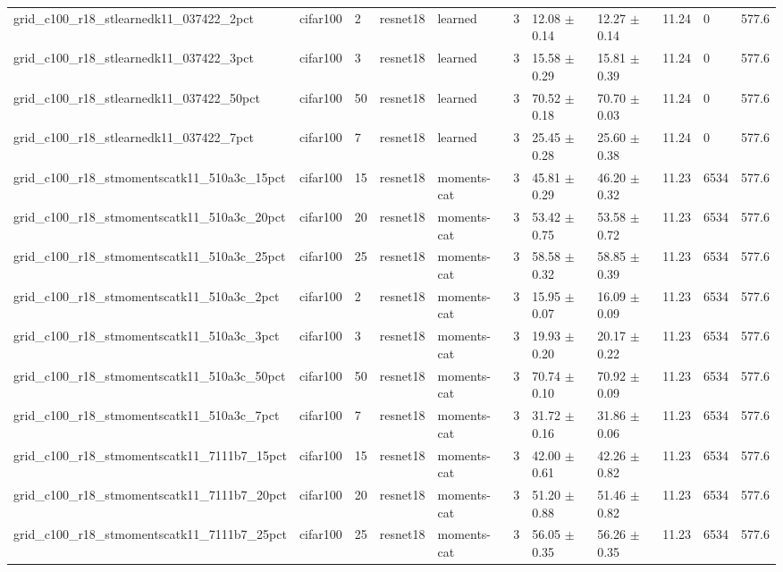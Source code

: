 \begin{tabular}{lllllllllll}
grid_c100_r18_stlearnedk11_037422_2pct & cifar100 & 2 & resnet18 & learned & 3 & 12.08 $\pm$ 0.14 & 12.27 $\pm$ 0.14 & 11.24 & 0 & 577.6 \\
grid_c100_r18_stlearnedk11_037422_3pct & cifar100 & 3 & resnet18 & learned & 3 & 15.58 $\pm$ 0.29 & 15.81 $\pm$ 0.39 & 11.24 & 0 & 577.6 \\
grid_c100_r18_stlearnedk11_037422_50pct & cifar100 & 50 & resnet18 & learned & 3 & 70.52 $\pm$ 0.18 & 70.70 $\pm$ 0.03 & 11.24 & 0 & 577.6 \\
grid_c100_r18_stlearnedk11_037422_7pct & cifar100 & 7 & resnet18 & learned & 3 & 25.45 $\pm$ 0.28 & 25.60 $\pm$ 0.38 & 11.24 & 0 & 577.6 \\
grid_c100_r18_stmomentscatk11_510a3c_15pct & cifar100 & 15 & resnet18 & moments-cat & 3 & 45.81 $\pm$ 0.29 & 46.20 $\pm$ 0.32 & 11.23 & 6534 & 577.6 \\
grid_c100_r18_stmomentscatk11_510a3c_20pct & cifar100 & 20 & resnet18 & moments-cat & 3 & 53.42 $\pm$ 0.75 & 53.58 $\pm$ 0.72 & 11.23 & 6534 & 577.6 \\
grid_c100_r18_stmomentscatk11_510a3c_25pct & cifar100 & 25 & resnet18 & moments-cat & 3 & 58.58 $\pm$ 0.32 & 58.85 $\pm$ 0.39 & 11.23 & 6534 & 577.6 \\
grid_c100_r18_stmomentscatk11_510a3c_2pct & cifar100 & 2 & resnet18 & moments-cat & 3 & 15.95 $\pm$ 0.07 & 16.09 $\pm$ 0.09 & 11.23 & 6534 & 577.6 \\
grid_c100_r18_stmomentscatk11_510a3c_3pct & cifar100 & 3 & resnet18 & moments-cat & 3 & 19.93 $\pm$ 0.20 & 20.17 $\pm$ 0.22 & 11.23 & 6534 & 577.6 \\
grid_c100_r18_stmomentscatk11_510a3c_50pct & cifar100 & 50 & resnet18 & moments-cat & 3 & 70.74 $\pm$ 0.10 & 70.92 $\pm$ 0.09 & 11.23 & 6534 & 577.6 \\
grid_c100_r18_stmomentscatk11_510a3c_7pct & cifar100 & 7 & resnet18 & moments-cat & 3 & 31.72 $\pm$ 0.16 & 31.86 $\pm$ 0.06 & 11.23 & 6534 & 577.6 \\
grid_c100_r18_stmomentscatk11_7111b7_15pct & cifar100 & 15 & resnet18 & moments-cat & 3 & 42.00 $\pm$ 0.61 & 42.26 $\pm$ 0.82 & 11.23 & 6534 & 577.6 \\
grid_c100_r18_stmomentscatk11_7111b7_20pct & cifar100 & 20 & resnet18 & moments-cat & 3 & 51.20 $\pm$ 0.88 & 51.46 $\pm$ 0.82 & 11.23 & 6534 & 577.6 \\
grid_c100_r18_stmomentscatk11_7111b7_25pct & cifar100 & 25 & resnet18 & moments-cat & 3 & 56.05 $\pm$ 0.35 & 56.26 $\pm$ 0.35 & 11.23 & 6534 & 577.6 \\

\end{tabular}
